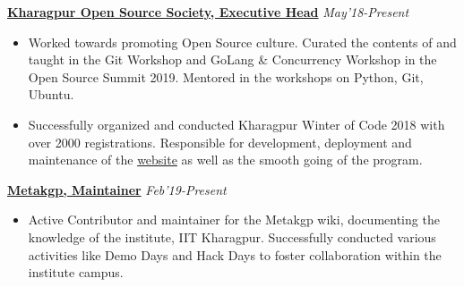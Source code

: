 \documentclass[a4paper,10pt]{extarticle} %
\begin{document}
\textbf{\href{https://kossiitkgp.in/}{Kharagpur Open Source Society, Executive Head}}     \hfill\textit{\small{May'18-Present}}
    \begin{itemize}[leftmargin=.15in]
        \item Worked towards promoting Open Source culture. Curated the contents of and taught in the Git Workshop and GoLang \& Concurrency Workshop in the Open Source Summit 2019. Mentored in the workshops on Python, Git, Ubuntu.
        \item Successfully organized and conducted Kharagpur Winter of Code 2018 with over 2000 registrations. Responsible for development, deployment and maintenance of the \href{https://github.com/kossiitkgp/kwoc-2018}{website} as well as the smooth going of the program.
    \end{itemize}


\textbf{\href{https://wiki.metakgp.org}{Metakgp, Maintainer}} \hfill\textit{\small{Feb'19-Present}}
    \begin{itemize}[leftmargin=.15in]
        \item Active Contributor and maintainer for the Metakgp wiki, documenting the knowledge of the institute, IIT Kharagpur. Successfully conducted various activities like Demo Days and Hack Days to foster collaboration within the institute campus. \\
    \end{itemize}

\end{document}
